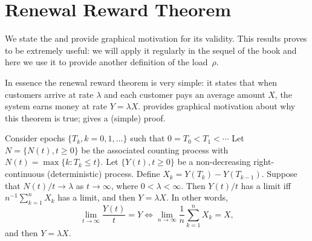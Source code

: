 \section{Renewal Reward Theorem}
\label{sec:renew-reward-theor}


We state the  and provide graphical motivation for its validity.
This results proves to be extremely useful: we will apply it regularly in the sequel of the book and here we use it to provide another definition of the load~$\rho$. 




In essence the renewal reward theorem is very simple: it states that when customers arrive at rate $\lambda$ and each customer pays an average amount $X$, the system earns money at rate $Y=\lambda X$.
 provides graphical motivation about why this theorem is true; \citet{el-taha98:_sampl_path_analy_queuein_system} gives a (simple) proof.

\begin{theorem}[Renewal Reward Theorem, $Y=\lambda X$]
 Consider epochs $\{T_k, k=0, 1, \ldots\}$ such that $0=T_0 < T_1 < \cdots$
 Let $N=\{N(t), t\geq 0\}$ be the associated counting process with $N(t) = \max\{k : T_k \leq t\}$.
 Let $\{Y(t), t\geq 0\}$ be a non-decreasing right-continuous (deterministic) process.
 Define $X_k = Y(T_k)-Y(T_{k-1})$.
 Suppose that $N(t)/t\to\lambda$ as $t\to\infty$, where $0<\lambda < \infty$.
 Then $Y(t)/t$ has a limit iff $n^{-1}\sum_{k=1}^n X_k$ has a limit, and then $Y=\lambda X$. In other words, 
 \begin{equation*}
 \lim_{t \to \infty} \frac{Y(t)}t=Y \iff \lim_{n \to \infty} \frac 1n\sum_{k=1}^n X_k = X, 
 \end{equation*}
and then $Y=\lambda X$. 
\end{theorem}


